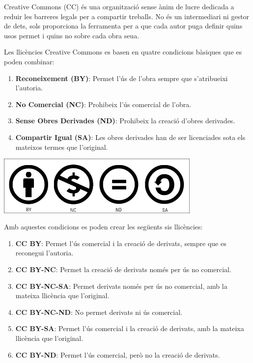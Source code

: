 \documentclass[
  12 pt,
  a4paper,
]{article}
\providecommand{\tightlist}{%
  \setlength{\itemsep}{0pt}\setlength{\parskip}{0pt}}
\begin{document}
Creative Commons (CC) és una organització sense ànim de lucre dedicada a
reduir les barreres legals per a compartir treballs. No és un
intermediari ni gestor de dets, sols proporciona la ferramenta per a que
cada autor puga definir quins usos permet i quins no sobre cada obra
seua.

Les llicències Creative Commons es basen en quatre condicions bàsiques
que es poden combinar:

\begin{enumerate}
\def\labelenumi{\arabic{enumi}.}
\tightlist
\item
  \textbf{Reconeixement (BY)}: Permet l'ús de l'obra sempre que
  s'atribueixi l'autoria.
\item
  \textbf{No Comercial (NC)}: Prohibeix l'ús comercial de l'obra.
\item
  \textbf{Sense Obres Derivades (ND)}: Prohibeix la creació d'obres
  derivades.
\item
  \textbf{Compartir Igual (SA)}: Les obres derivades han de ser
  licenciades sota els mateixos termes que l'original.
\end{enumerate}

\includegraphics[width=0.75\textwidth,height=\textheight]{../recursos/cc-icons.jpg}

Amb aquestes condicions es poden crear les següents sis llicències:

\begin{enumerate}
\def\labelenumi{\arabic{enumi}.}
\tightlist
\item
  \textbf{CC BY}: Permet l'ús comercial i la creació de derivats, sempre
  que es reconegui l'autoria.
\item
  \textbf{CC BY-NC}: Permet la creació de derivats només per ús no
  comercial.
\item
  \textbf{CC BY-NC-SA}: Permet derivats només per ús no comercial, amb
  la mateixa llicència que l'original.
\item
  \textbf{CC BY-NC-ND}: No permet derivats ni ús comercial.
\item
  \textbf{CC BY-SA}: Permet l'ús comercial i la creació de derivats, amb
  la mateixa llicència que l'original.
\item
  \textbf{CC BY-ND}: Permet l'ús comercial, però no la creació de
  derivats.
\end{enumerate}
\end{document}

